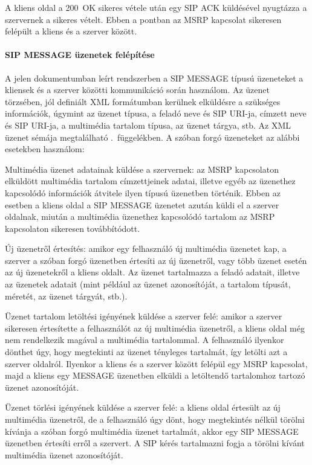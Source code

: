 A kliens oldal a 200~OK sikeres vétele után egy SIP ACK küldésével nyugtázza a szervernek a sikeres vételt. Ebben a pontban az MSRP kapcsolat sikeresen felépült a kliens és a szerver között.

\paragraph{SIP MESSAGE üzenetek felépítése\\}
\label{sec:sip_message}

A jelen dokumentumban leírt rendszerben a SIP MESSAGE típusú üzeneteket a kliensek és a szerver közötti kommunikáció során használom. Az üzenet törzsében, jól definiált XML formátumban kerülnek elküldésre a szükséges információk, úgymint az üzenet típusa, a feladó neve és SIP URI-ja, címzett neve és SIP URI-ja, a multimédia tartalom típusa, az üzenet tárgya, stb. Az XML üzenet sémája megtalálható .~függelékben. A szóban forgó üzeneteket az alábbi esetekben használom:
\begin{mydescription}
\item[Multimédia üzenet adatainak küldése a szervernek:] az MSRP kapcsolaton elküldött multimédia tartalom címzettjeinek adatai, illetve egyéb az üzenethez kapcsolódó információk átvitele ilyen típusú üzenetben történik. Ebben az esetben a kliens oldal a SIP MESSAGE üzenetet azután küldi el a szerver oldalnak, miután a multimédia üzenethez kapcsolódó tartalom az MSRP kapcsolaton sikeresen továbbítódott.
\item[Új üzenetről értesítés:] amikor egy felhasználó új multimédia üzenetet kap, a szerver a szóban forgó üzenetben értesíti az új üzenetről, vagy több üzenet esetén az új üzenetekről a kliens oldalt. Az üzenet tartalmazza a feladó adatait, illetve az üzenetek adatait (mint például az üzenet azonosítóját, a tartalom típusát, méretét, az üzenet tárgyát, stb.).
\item[Üzenet tartalom letöltési igényének küldése a szerver felé:] amikor a szerver sikeresen értesítette a felhasználót az új multimédia üzenetről, a kliens oldal még nem rendelkezik magával a multimédia tartalommal. A felhasználó ilyenkor dönthet úgy, hogy megtekinti az üzenet tényleges tartalmát, így letölti azt a szerver oldalról. Ilyenkor a kliens és a szerver között felépül egy MSRP kapcsolat, majd a kliens egy MESSAGE üzenetben elküldi a letöltendő tartalomhoz tartozó üzenet azonosítóját.
\item[Üzenet törlési igényének küldése a szerver felé:] a kliens oldal értesült az új multimédia üzenetről, de a felhasználó úgy dönt, hogy megtekintés nélkül törölni kívánja a szóban forgó multimédia üzenet tartalmát, akkor egy SIP MESSAGE üzenetben értesíti erről a szervert. A SIP kérés  tartalmazni fogja a törölni kívánt multimédia üzenet azonosítóját.

\end{mydescription}


